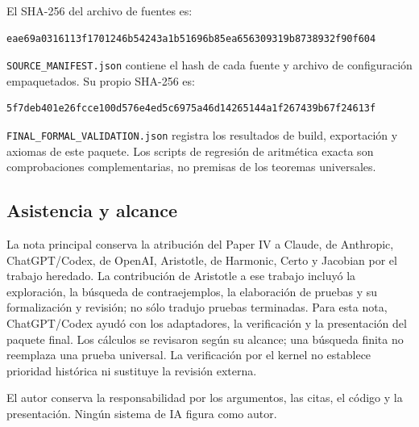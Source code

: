 \documentclass[spanish,11pt,a4paper]{article}
\begin{document}
El SHA-256 del archivo de fuentes es:

\begin{verbatim}
eae69a0316113f1701246b54243a1b51696b85ea656309319b8738932f90f604
\end{verbatim}

\nolinkurl{SOURCE_MANIFEST.json} contiene el hash de cada fuente y archivo
de configuración empaquetados. Su propio SHA-256 es:

\begin{verbatim}
5f7deb401e26fcce100d576e4ed5c6975a46d14265144a1f267439b67f24613f
\end{verbatim}

\nolinkurl{FINAL_FORMAL_VALIDATION.json} registra los resultados de
build, exportación y axiomas de este paquete. Los scripts de regresión
de aritmética exacta son comprobaciones complementarias, no premisas de
los teoremas universales.

\subsection{Asistencia y alcance}\label{asistencia-y-alcance}

La nota principal conserva la atribución del Paper IV a Claude, de
Anthropic, ChatGPT/Codex, de OpenAI, Aristotle, de Harmonic, Certo y
Jacobian por el trabajo heredado. La contribución de Aristotle a ese
trabajo incluyó la exploración, la búsqueda de contraejemplos, la
elaboración de pruebas y su formalización y revisión; no sólo tradujo
pruebas terminadas. Para esta nota, ChatGPT/Codex ayudó con los
adaptadores, la verificación y la presentación del paquete final. Los
cálculos se revisaron según su alcance; una búsqueda finita no reemplaza
una prueba universal. La verificación por el kernel no establece
prioridad histórica ni sustituye la revisión externa.

El autor conserva la responsabilidad por los argumentos, las citas, el
código y la presentación. Ningún sistema de IA figura como autor.
\end{document}
